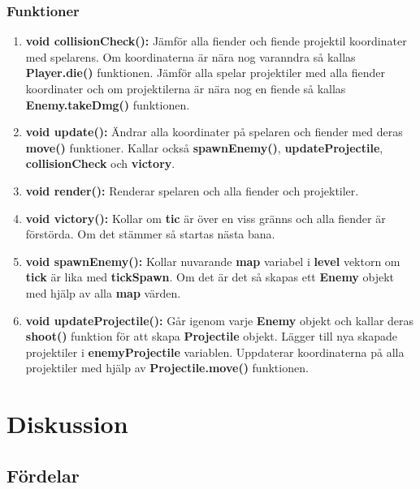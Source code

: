 \documentclass{TDP005mall}
\begin{document}
 \subsubsection*{Funktioner}
 \begin{enumerate}
   \item \textbf{void collisionCheck(): } Jämför alla fiender och fiende projektil koordinater med spelarens.
                                          Om koordinaterna är nära nog varanndra så kallas \textbf{Player.die()} funktionen.
                                          Jämför alla spelar projektiler med alla fiender koordinater och om projektilerna är nära nog en fiende så kallas \textbf{Enemy.takeDmg()} funktionen.
  \item \textbf{void update(): } Ändrar alla koordinater på spelaren och fiender med deras \textbf{move()} funktioner.
                                Kallar också \textbf{spawnEnemy()}, \textbf{updateProjectile}, \textbf{collisionCheck} och \textbf{victory}.
  \item \textbf{void render(): } Renderar spelaren och alla fiender och projektiler.
  \item \textbf{void victory(): } Kollar om \textbf{tic} är över en viss gränns och alla fiender är förstörda.
                                  Om det stämmer så startas nästa bana.
  \item \textbf{void spawnEnemy(): } Kollar nuvarande \textbf{map} variabel i \textbf{level} vektorn om \textbf{tick} är lika med \textbf{tickSpawn}.
                                      Om det är det så skapas ett \textbf{Enemy} objekt med hjälp av alla \textbf{map} värden.

  \item \textbf{void updateProjectile(): } Går igenom varje \textbf{Enemy} objekt och kallar deras \textbf{shoot()} funktion för att skapa \textbf{Projectile} objekt.
                                           Lägger till nya skapade projektiler i \textbf{enemyProjectile} variablen.
                                           Uppdaterar koordinaterna på alla projektiler med hjälp av \textbf{Projectile.move()} funktionen.

  \end{enumerate}
\section{Diskussion}

\subsection{Fördelar}
\end{document}
